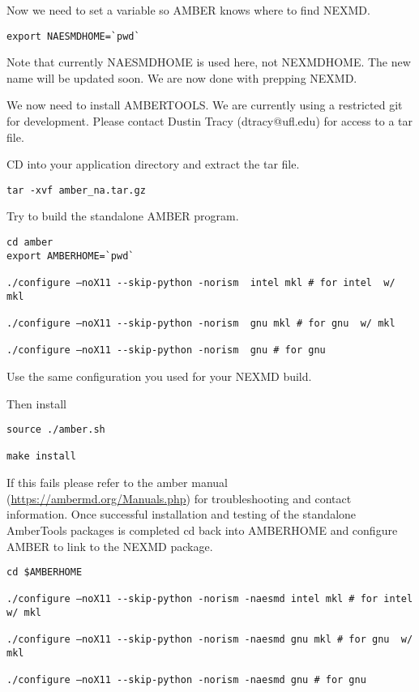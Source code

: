\documentclass[11pt]{article}
\begin{document}
Now we need to set a variable so AMBER knows where to find NEXMD. 

\begin{verbatim}
export NAESMDHOME=`pwd` 
\end{verbatim}

Note that currently NAESMDHOME is used here, not NEXMDHOME. The new name will be
updated soon. We are now done with prepping NEXMD.

We now need to install AMBERTOOLS. We are currently using a restricted git for
development. Please contact Dustin Tracy (dtracy@ufl.edu) for access to a tar
file.

CD into your application directory and extract the tar file. 

\begin{verbatim}
tar -xvf amber_na.tar.gz 
\end{verbatim}

Try to build the standalone AMBER program.  

\begin{verbatim}
cd amber 
export AMBERHOME=`pwd` 

./configure –noX11 --skip-python -norism  intel mkl # for intel  w/ mkl 

./configure –noX11 --skip-python -norism  gnu mkl # for gnu  w/ mkl 

./configure –noX11 --skip-python -norism  gnu # for gnu 
\end{verbatim}

Use the same configuration you used for your NEXMD build. 

Then install 

\begin{verbatim}
source ./amber.sh 

make install 
\end{verbatim}

If this fails please refer to the amber manual (\url{https://ambermd.org/Manuals.php})
for troubleshooting and contact information. Once successful installation and
testing of the standalone AmberTools packages is completed cd back into
AMBERHOME and configure AMBER to link to the NEXMD package.

\begin{verbatim}
cd $AMBERHOME 

./configure –noX11 --skip-python -norism -naesmd intel mkl # for intel  w/ mkl 

./configure –noX11 --skip-python -norism -naesmd gnu mkl # for gnu  w/ mkl 

./configure –noX11 --skip-python -norism -naesmd gnu # for gnu 
\end{verbatim}
\end{document}

